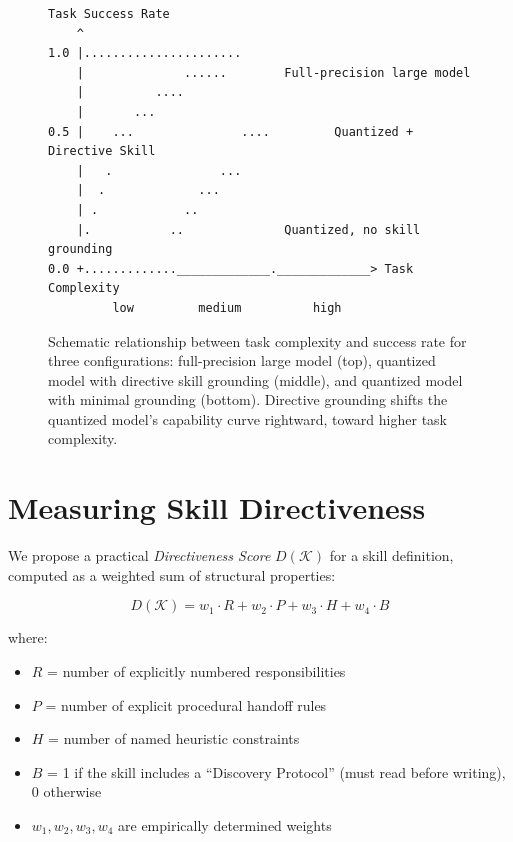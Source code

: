 \documentclass[11pt,a4paper]{article}
\begin{document}
\begin{figure}[h]
\centering
\begin{minipage}{0.85\textwidth}
\begin{lstlisting}[language={},basicstyle=\small\ttfamily]
Task Success Rate
    ^
1.0 |......................
    |              ......        Full-precision large model
    |          ....
    |       ...
0.5 |    ...               ....         Quantized + Directive Skill
    |   .               ...
    |  .             ...
    | .            ..
    |.           ..              Quantized, no skill grounding
0.0 +............._____________._____________> Task Complexity
         low         medium          high
\end{lstlisting}
\end{minipage}
\caption{Schematic relationship between task complexity and success rate for
three configurations: full-precision large model (top), quantized model with
directive skill grounding (middle), and quantized model with minimal grounding
(bottom). Directive grounding shifts the quantized model's capability curve
rightward, toward higher task complexity.}
\label{fig:dist}
\end{figure}

\section{Measuring Skill Directiveness}
\label{sec:directiveness}

We propose a practical \emph{Directiveness Score} $D(\mathcal{K})$ for a
skill definition, computed as a weighted sum of structural properties:

\[
  D(\mathcal{K}) = w_1 \cdot R + w_2 \cdot P + w_3 \cdot H + w_4 \cdot B
\]

where:
\begin{itemize}[noitemsep]
  \item $R$ = number of explicitly numbered responsibilities
  \item $P$ = number of explicit procedural handoff rules
  \item $H$ = number of named heuristic constraints
  \item $B$ = 1 if the skill includes a ``Discovery Protocol'' (must read
    before writing), 0 otherwise
  \item $w_1, w_2, w_3, w_4$ are empirically determined weights
\end{itemize}
\end{document}
